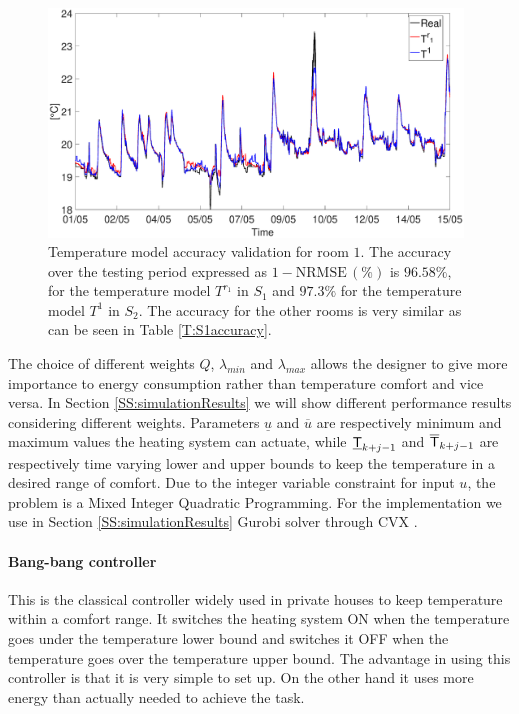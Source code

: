 \begin{figure}[t!]
	\begin{center}
		\includegraphics[width=26pc]{figures/temperature_testing.eps}
		\caption{Temperature model accuracy validation for room $1$. The accuracy over the testing period expressed as $\mathrm{1-NRMSE}\,(\%)$ is $96.58\%$, for the temperature model $T^{r_1}$ in $S_1$ and $97.3\%$ for the temperature model $T^1$ in $S_2$. The accuracy for the other rooms is very similar as can be seen in Table \ref{T:S1accuracy}.}
		\label{F:temperature_testing}	
	\end{center}
\end{figure}

The choice of different weights $Q$, $\lambda_{min}$ and $\lambda_{max}$ allows the designer to give more importance to energy consumption rather than temperature comfort and vice versa.
In Section \ref{SS:simulationResults} we will show different performance results considering different weights. Parameters $\underline{u}$ and $\overline{u}$ are respectively minimum and maximum values the heating system can actuate, while $\underline{\mathsf{T}}_{k+j-1}$ and $\overline{\mathsf{T}}_{k+j-1}$ are respectively time varying lower and upper bounds to keep the temperature in a desired range of comfort.
Due to the integer variable constraint for input $u$, the problem is a Mixed Integer Quadratic Programming. For the implementation we use in Section \ref{SS:simulationResults} Gurobi solver \cite{Gurobi2015} through CVX \cite{cvx,gb08}.

\paragraph{Bang-bang controller}
This is the classical controller widely used in private houses to keep temperature within a comfort range. It switches the heating system ON when the temperature goes under the temperature lower bound and switches it OFF when the temperature goes over the temperature upper bound. The advantage in using this controller is that it is very simple to set up. On the other hand it uses more energy than actually needed to achieve the task.

